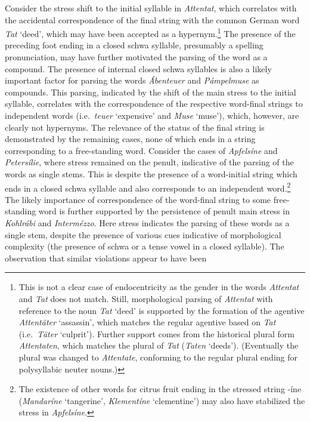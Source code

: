 \documentclass[output=paper
 ,nobabel
 ,draftmode
 ,colorlinks, citecolor=brown
]{langscibook}
\begin{document}
\largerpage
\noindent
Consider the stress shift to the initial syllable in \emph{Attentat}, which correlates with the
accidental correspondence of the final string with the common German word \emph{Tat} `deed', which
may have been accepted as a hypernym.\footnote{This is not a clear case of endocentricity as the
  gender in the words \emph{Attentat} and \emph{Tat} does not match. Still, morphological parsing of
  \emph{Attentat} with reference to the noun \emph{Tat} `deed' is supported by the formation of the
  agentive \emph{Attentäter} `assassin', which matches the regular agentive based on \emph{Tat}
  (i.e.\ \emph{Täter} `culprit'). Further support comes from the historical plural form
  \emph{Attentaten}, which matches the plural of \emph{Tat} (\emph{Taten} `deeds'). (Eventually the
  plural was changed to \emph{Attentate}, conforming to the regular plural ending for polysyllabic
  neuter nouns.)} The presence of the preceding foot ending in a closed schwa syllable, presumably a
spelling pronunciation, may have further motivated the parsing of the word as a compound. The
presence of internal closed schwa syllables is also a likely important factor for parsing the words
\emph{Ábenteuer} and \emph{Pámpelmuse} as compounds. This parsing, indicated by the shift of the
main stress to the initial syllable, correlates with the correspondence of the respective word-final
strings to independent words (i.e.\ \emph{teuer} `expensive' and \emph{Muse} `muse'), which,
however, are clearly not hypernyms. The relevance of the status of the final string is demonstrated
by the remaining cases, none of which ends in a string corresponding to a free-standing
word. Consider the cases of \emph{Apfelsíne} and \emph{Petersílie}, where stress remained on the
penult, indicative of the parsing of the words as single stems. This is despite the presence of a
word-initial string which ends in a closed schwa syllable and also corresponds to an independent
word.\footnote{The existence of other words for citrus fruit ending in the stressed string {-íne}
  (\emph{Mandaríne} `tangerine', \emph{Klementíne} `clementine') may also have stabilized the stress
  in \emph{Apfelsíne}.} The likely importance of correspondence of the word-final string to some
free-standing word is further supported by the persistence of penult main stress in \emph{Kohlrábi}
and \emph{Intermézzo}. Here stress indicates the parsing of these words as a single stem, despite
the presence of various cues indicative of morphological complexity (\eg the presence of schwa or a
tense vowel in a closed syllable). The observation that similar violations appear to have been
\end{document}
